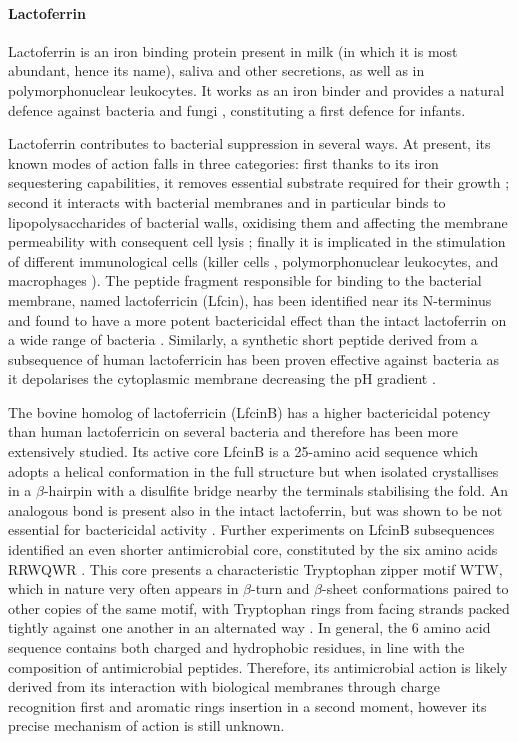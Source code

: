 \paragraph{Lactoferrin} Lactoferrin is an iron binding protein present in milk (in which it is most abundant, hence its name), saliva and other secretions, as well as in polymorphonuclear leukocytes.
%
It works as an iron binder and provides a natural defence against bacteria and fungi \cite{Sanchez1992,Arnold1977,Arnold1980,Kirkpatrick1971,Jahani2015}, constituting a first defence for infants.

Lactoferrin contributes to bacterial suppression in several ways. At present, its known modes of action falls in three categories: first thanks to its iron sequestering capabilities, it removes essential substrate required for their growth \cite{Farnaud2003}; second it interacts with bacterial membranes and in particular binds to lipopolysaccharides of bacterial walls, oxidising them and affecting the membrane permeability with consequent cell lysis \cite{Farnaud2003}; finally it is implicated in the stimulation of different immunological cells (killer cells \cite{Shau1992}, polymorphonuclear leukocytes, and macrophages \cite{Gahr1991}).
The peptide fragment responsible for binding to the bacterial membrane, named lactoferricin (Lfcin), has been identified near its N-terminus and found to have a more potent bactericidal effect than the intact lactoferrin on a wide range of bacteria \cite{Gifford2005,Bellamy1992,Tomita1994,Wakabayashi1996}.
%
Similarly, a synthetic short peptide derived from a subsequence of human lactoferricin has been proven effective against bacteria as it depolarises the cytoplasmic membrane decreasing the pH gradient \cite{Aguilera1999}.

The bovine homolog of lactoferricin (LfcinB) has a higher bactericidal potency than human lactoferricin on several bacteria \cite{Cochran2001} and therefore has been more extensively studied. Its active core LfcinB is a 25-amino acid sequence which adopts a helical conformation in the full structure but when isolated crystallises in a $\beta$-hairpin with a disulfite bridge nearby the terminals stabilising the fold. An analogous bond is present also in the intact lactoferrin, but was shown to be not essential for bactericidal activity \cite{Cochran2001}.
%
Further experiments on LfcinB subsequences identified an even shorter antimicrobial core, constituted by the six amino acids RRWQWR \cite{Schibli1999}. This core presents a characteristic Tryptophan zipper motif WTW, which in nature very often appears in $\beta$-turn and $\beta$-sheet conformations paired to other copies of the same motif, with Tryptophan rings from facing strands packed tightly against one another in an alternated way \cite{Cochran2001}.
In general, the 6 amino acid sequence contains both charged and hydrophobic residues, in line with the composition of antimicrobial peptides. Therefore, its antimicrobial action is likely derived from its interaction with biological membranes through charge recognition first and aromatic rings insertion in a second moment, however its precise mechanism of action is still unknown.

